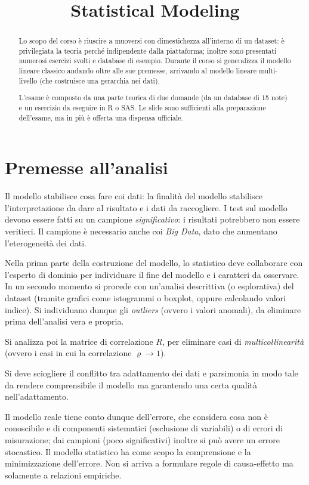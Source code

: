 \documentclass[11pt, twocolumn]{article}
\title{\textbf{Statistical Modeling}}
\author{}
\date{}
\begin{document}
\maketitle
\begin{abstract}
  Lo scopo del corso è riuscire a muoversi con dimestichezza all'interno di un dataset: è privilegiata la teoria perché indipendente dalla piattaforma; inoltre sono presentati numerosi esercizi svolti e database di esempio.
  Durante il corso si generalizza il modello lineare classico andando oltre alle sue premesse, arrivando al modello lineare multi-livello (che costruisce una gerarchia nei dati).

  L'esame è composto da una parte teorica di due domande (da un database di 15 note) e un esercizio da eseguire in R o SAS.
  Le slide sono sufficienti alla preparazione dell'esame, ma in più è offerta una dispensa ufficiale.
\end{abstract}

\newpage
\part{Premesse all'analisi}
Il modello stabilisce cosa fare coi dati: la finalità del modello stabilisce l'interpretazione da dare al risultato e i dati da raccogliere.
I test sul modello devono essere fatti su un campione \textit{significativo}: i risultati potrebbero non essere veritieri.
Il campione è necessario anche coi \textit{Big Data}, dato che aumentano l'eterogeneità dei dati.

Nella prima parte della costruzione del modello, lo statistico deve collaborare con l'esperto di dominio per individuare il fine del modello e i caratteri da osservare.
In un secondo momento si procede con un'analisi descrittiva (o esplorativa) del dataset (tramite grafici come istogrammi o boxplot, oppure calcolando valori indice).
Si individuano dunque gli \textit{outliers} (ovvero i valori anomali), da eliminare prima dell'analisi vera e propria.

Si analizza poi la matrice di correlazione $R$, per eliminare casi di \textit{multicollinearità} (ovvero i casi in cui la correlazione $\varrho \to 1$).

Si deve sciogliere il conflitto tra adattamento dei dati e parsimonia in modo tale da rendere comprensibile il modello ma garantendo una certa qualità nell'adattamento.

Il modello reale tiene conto dunque dell'errore, che considera cosa non è conoscibile e di componenti sistematici (esclusione di variabili) o di errori di misurazione; dai campioni (poco significativi) inoltre si può avere un errore stocastico.
Il modello statistico ha come scopo la comprensione e la minimizzazione dell'errore.
Non si arriva a formulare regole di causa-effetto ma solamente a relazioni empiriche.
\end{document}
